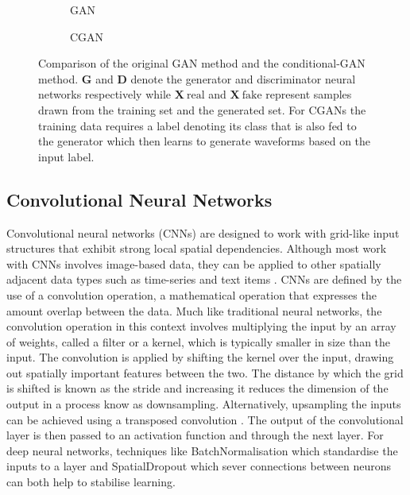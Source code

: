 \documentclass[12pt]{iopart}
\begin{document}
\begin{figure}[h!]
    \begin{subfigure}{.5\textwidth}
     \centering
        
        \caption{GAN}
    \end{subfigure}
    \begin{subfigure}{.5\textwidth}
     \centering
        
        \caption{CGAN}
    \end{subfigure}
    \caption{Comparison of the original GAN method and the
conditional-GAN method. $\textbf{G}$ and $\textbf{D}$ denote the generator and discriminator neural networks respectively while $\textbf{X}~\text{real}$ and $\textbf{X}~\text{fake}$ represent samples drawn from the training set and the generated set. For CGANs the training data requires a label denoting
its class that is also fed to the generator which then learns to generate
waveforms based on the input label.}
\label{fig:gan_comparison}
\end{figure}

\subsection{Convolutional Neural Networks}
%
Convolutional neural networks (CNNs) are designed to work with grid-like input structures that exhibit
strong local spatial dependencies. Although most work with \acp{CNN}
involves image-based data, they can be applied to other spatially adjacent data
types such as time-series \cite{2018arXiv180904356I} and text items \cite{2020arXiv200403705M}. \acp{CNN} are defined by the use of a
convolution operation, a mathematical operation that expresses the amount
overlap between the data. Much like traditional neural networks, the convolution operation in this context involves multiplying the input by an array of weights, called a filter or a kernel, which is typically smaller in size than the input. The convolution is applied by shifting the kernel over the input, drawing out spatially important features between the
two. The distance by which the grid is shifted is known as
the stride and increasing it reduces the dimension of the output in a process know as downsampling. Alternatively, upsampling the inputs can be achieved using a transposed convolution \cite{dumoulin2016guide}. The output of the convolutional layer is then passed to an activation function and through the next layer. For deep neural networks, techniques like BatchNormalisation \cite{ioffe2015batch} which standardise the inputs to a layer and SpatialDropout \cite{tompson2014efficient} which sever connections between neurons can both help to stabilise learning.  
\end{document}
